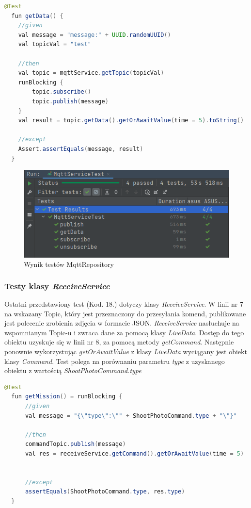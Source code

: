 \begin{lstlisting}[language=Java, caption=Test pobierania danych za pomocą \textit{MqttService}]
  @Test
  fun getData() {
    //given
    val message = "message:" + UUID.randomUUID()
    val topicVal = "test"

    //then
    val topic = mqttService.getTopic(topicVal)
    runBlocking {
        topic.subscribe()
        topic.publish(message)
    }
    val result = topic.getData().getOrAwaitValue(time = 5).toString()

    //except
    Assert.assertEquals(message, result)
  }
\end{lstlisting}

\begin{figure}[!ht]
\begin{center}
  \includegraphics[width=12cm]{./Obrazy/MqttTestResult.png}
  \caption{Wynik testów MqttRepository}
\end{center}
\end{figure}

\subsubsection{Testy klasy \textit{ReceiveService}}

Ostatni przedstawiony test (Kod. 18.) dotyczy klasy \textit{ReceiveService}. W linii nr 7 na wskazany Topic, który jest przeznaczony do przesyłania komend, publikowane jest polecenie zrobienia zdjęcia w formacie JSON. \textit{ReceiveService} nasłuchuje na wspomnianym Topic-u i zwraca dane za pomocą klasy \textit{LiveData}. Dostęp do tego obiektu uzyskuje się w linii nr 8, za pomocą metody \textit{getCommand}. Następnie ponownie wykorzystując \textit{getOrAwaitValue} z klasy \textit{LiveData} wyciągany jest obiekt klasy \textit{Command}. Test polega na porównaniu parametru \textit{type} z uzyskanego obiektu z wartością \textit{ShootPhotoCommand.type}

\begin{lstlisting}[language=Java, caption=Test pobierania komend przez \textit{ReceiveService}]
  @Test
  fun getMission() = runBlocking {
      //given
      val message = "{\"type\":\"" + ShootPhotoCommand.type + "\"}"

      //then
      commandTopic.publish(message)
      val res = receiveService.getCommand().getOrAwaitValue(time = 5)


      //except
      assertEquals(ShootPhotoCommand.type, res.type)
  }
\end{lstlisting}

